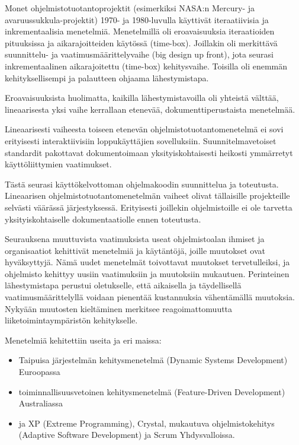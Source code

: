 \documentclass[finnish]{tktltiki2}
\theoremstyle{definition}
\theoremstyle{remark}
\begin{document}
Monet ohjelmistotuotantoprojektit  (esimerkiksi NASA:n Mercury- ja avaruussukkula-projektit) 1970- ja 1980-luvulla käyttivät iteraatiivisia ja inkrementaalisia menetelmiä.  Menetelmillä oli eroavaisuuksia iteraatioiden pituuksissa ja aikarajoitteiden käytössä (time-box). Joillakin oli merkittävä suunnittelu- ja vaatimusmäärittelyvaihe (big design up front), jota seurasi inkrementaalinen aikarajoitettu (time-box) kehitysvaihe. Toisilla oli enemmän kehityksellisempi ja palautteen ohjaama lähestymistapa\cite{LAB03}.

Eroavaisuuksista huolimatta, kaikilla lähestymistavoilla oli yhteistä välttää, lineaarisesta yksi vaihe kerrallaan etenevää, dokumenttiperustaista menetelmää\cite{LAB03}.

Lineaarisesti vaiheesta toiseen etenevän ohjelmistotuotantomenetelmä ei sovi erityisesti interaktiivisiin loppukäyttäjien sovelluksiin. Suunnitelmavetoiset standardit pakottavat dokumentoimaan yksityiskohtaisesti heikosti ymmärretyt käyttöliittymien vaatimukset\cite{BOE88}.

Tästä seurasi käyttökelvottoman ohjelmakoodin suunnittelua ja toteutusta. Lineaarisen ohjelmistotuotantomenetelmän vaiheet olivat tällaisille projekteille selvästi väärässä järjestyksessä. Erityisesti joillekin ohjelmistoille ei ole tarvetta yksityiskohtaiselle dokumentaatiolle ennen toteutusta\cite{BOE88}.

Seurauksena muuttuvista vaatimuksista useat ohjelmistoalan ihmiset ja organisaatiot kehittivät menetelmiä ja käytäntöjä, joille muutokset ovat hyväksyttyjä. Nämä uudet menetelmät toivottavat muutokset tervetulleiksi, ja ohjelmisto kehittyy uusiin vaatimuksiin ja muutoksiin mukautuen\cite{WIC03}. Perinteinen lähestymistapa perustui oletukselle, että aikaisella ja täydellisellä vaatimusmäärittelyllä voidaan pienentää kustannuksia vähentämällä muutoksia. Nykyään muutosten kieltäminen merkitsee reagoimattomuutta liiketoimintaympäristön kehitykselle\cite{HIC01}.

Menetelmiä kehitettiin useita ja eri maissa: 
\begin{itemize}
 \item Taipuisa järjestelmän kehitysmenetelmä (Dynamic Systems Development) Euroopassa
 \item toiminnallisuusvetoinen kehitysmenetelmä (Feature-Driven Development) Australiassa
 \item ja XP (Extreme Programming)\cite{BEC99}, Crystal\cite{COC05}, mukautuva ohjelmistokehitys (Adaptive Software Development) ja Scrum\cite{SCH09} Yhdysvalloissa\cite{WIC03}.
\end{itemize}
\end{document}
